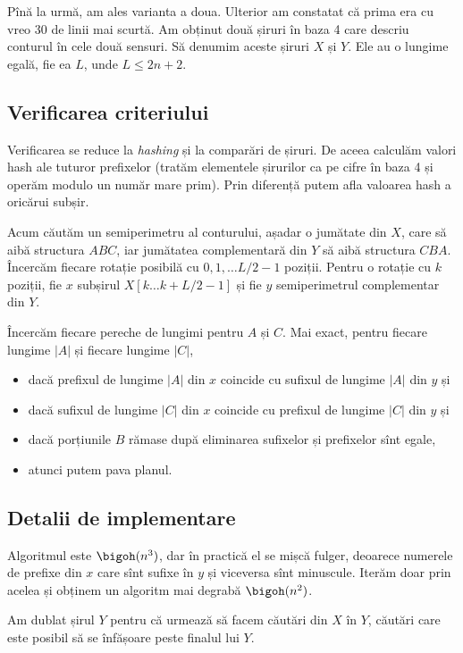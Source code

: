 Pînă la urmă, am ales varianta a doua. Ulterior am constatat că prima era cu vreo 30 de linii mai scurtă.  Am obținut două șiruri în baza 4 care descriu conturul în cele două sensuri. Să denumim aceste șiruri $X$ și $Y$. Ele au o lungime egală, fie ea $L$, unde $L \leq 2n + 2$.

\subsection{Verificarea criteriului}

Verificarea se reduce la \textit{hashing} și la comparări de șiruri. De aceea calculăm valori hash ale tuturor prefixelor (tratăm elementele șirurilor ca pe cifre în baza 4 și operăm modulo un număr mare prim). Prin diferență putem afla valoarea hash a oricărui subșir.

Acum căutăm un semiperimetru al conturului, așadar o jumătate din $X$, care să aibă structura $ABC$, iar jumătatea complementară din $Y$ să aibă structura  $CBA$. Încercăm fiecare rotație posibilă cu $0, 1, \dots L/2-1$ poziții. Pentru o rotație cu $k$ poziții, fie $x$ subșirul $X[k \dots k + L/2 - 1]$ și fie $y$ semiperimetrul complementar din $Y$.

Încercăm fiecare pereche de lungimi pentru $A$ și $C$. Mai exact, pentru fiecare lungime $|A|$ și fiecare lungime $|C|$,

\begin{itemize}
  \item dacă prefixul de lungime $|A|$ din $x$ coincide cu sufixul de lungime $|A|$ din $y$ și
  \item dacă sufixul de lungime $|C|$ din $x$ coincide cu prefixul de lungime $|C|$ din $y$ și
  \item dacă porțiunile $B$ rămase după eliminarea sufixelor și prefixelor sînt egale,
  \item atunci putem pava planul.
\end{itemize}

\subsection{Detalii de implementare}

Algoritmul este $\bigoh(n^3)$, dar în practică el se mișcă fulger, deoarece numerele de prefixe din $x$ care sînt sufixe în $y$ și viceversa sînt minuscule. Iterăm doar prin acelea și obținem un algoritm mai degrabă $\bigoh(n^2)$.

Am dublat șirul $Y$ pentru că urmează să facem căutări din $X$ în $Y$, căutări care este posibil să se înfășoare peste finalul lui $Y$.


